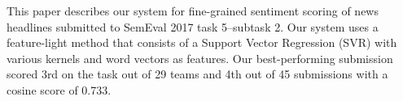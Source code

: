 This paper describes our system for fine-grained sentiment scoring of news headlines submitted to SemEval 2017 task 5--subtask 2. Our system uses a feature-light method that consists of a Support Vector Regression (SVR) with various kernels and word vectors as features. Our best-performing submission scored 3rd on the task out of 29 teams and 4th out of 45 submissions with a cosine score of 0.733.
